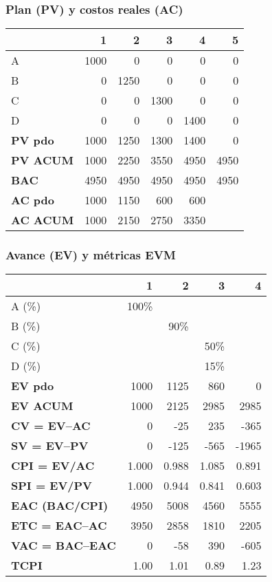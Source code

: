 \subsubsection*{Plan (PV) y costos reales (AC)}
\begin{table}[H]\centering\small
\begin{tabular}{lrrrrr}
\toprule
 & \textbf{1} & \textbf{2} & \textbf{3} & \textbf{4} & \textbf{5} \\
\midrule
A & 1000 & 0 & 0 & 0 & 0 \\
B & 0 & 1250 & 0 & 0 & 0 \\
C & 0 & 0 & 1300 & 0 & 0 \\
D & 0 & 0 & 0 & 1400 & 0 \\
\midrule
\textbf{PV pdo}   & 1000 & 1250 & 1300 & 1400 & 0 \\
\textbf{PV ACUM}  & 1000 & 2250 & 3550 & 4950 & 4950 \\
\textbf{BAC}      & 4950 & 4950 & 4950 & 4950 & 4950 \\
\midrule
\textbf{AC pdo}   & 1000 & 1150 & 600 & 600 &  \\
\textbf{AC ACUM}  & 1000 & 2150 & 2750 & 3350 &  \\
\bottomrule
\end{tabular}
\end{table}

\subsubsection*{Avance (EV) y métricas EVM}
\begin{table}[H]\centering\small
\begin{tabular}{lrrrr}
\toprule
 & \textbf{1} & \textbf{2} & \textbf{3} & \textbf{4} \\
\midrule
A (\%) & 100\% &  &  &  \\
B (\%) &  & 90\% &  &  \\
C (\%) &  &  & 50\% &  \\
D (\%) &  &  & 15\% &  \\
\midrule
\textbf{EV pdo}  & 1000 & 1125 & 860 & 0 \\
\textbf{EV ACUM} & 1000 & 2125 & 2985 & 2985 \\
\midrule
\textbf{CV = EV--AC}   & 0 & -25 & 235 & -365 \\
\textbf{SV = EV--PV}   & 0 & -125 & -565 & -1965 \\
\textbf{CPI = EV/AC}   & 1.000 & 0.988 & 1.085 & 0.891 \\
\textbf{SPI = EV/PV}   & 1.000 & 0.944 & 0.841 & 0.603 \\
\midrule
\textbf{EAC (BAC/CPI)} & 4950 & 5008 & 4560 & 5555 \\
\textbf{ETC = EAC--AC} & 3950 & 2858 & 1810 & 2205 \\
\textbf{VAC = BAC--EAC}& 0 & -58 & 390 & -605 \\
\textbf{TCPI}          & 1.00 & 1.01 & 0.89 & 1.23 \\
\bottomrule
\end{tabular}
\end{table}


